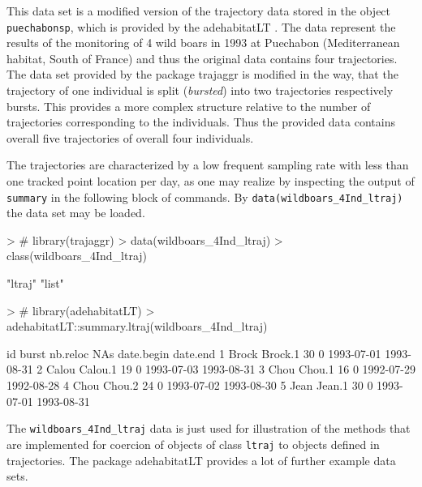 \documentclass[12pt, oneside, a4paper]{scrbook}
\newcommand{\pkg}[1]{{\normalfont\fontseries{b}\selectfont #1}}
\let\code=\texttt
\begin{document}
This data set is a modified version of the trajectory data stored in the object \code{puechabonsp}, which is provided by the \pkg{adehabitatLT} \citep{calenge_adehabitatlt:_2014}. The data represent the results of the monitoring of 4 wild boars in 1993 at Puechabon (Mediterranean habitat, South of France) and thus the original data contains four trajectories. The data set provided by the package \pkg{trajaggr} is modified in the way, that the trajectory of one individual is split (\textit{bursted}) into two trajectories respectively bursts. 
This provides a more complex structure relative to the number of trajectories corresponding to the individuals. Thus the provided data contains overall five trajectories of overall four individuals.
\par\medskip

The trajectories are characterized by a low frequent sampling rate with less than one tracked point location per day, as one may realize by inspecting the output of \code{summary} in the following block of commands. By \code{data(wildboars\_4Ind\_ltraj)} the data set may be loaded.
\par\medskip

\begin{small}
\begin{Schunk}
\begin{Sinput}
> # library(trajaggr)
> data(wildboars_4Ind_ltraj)
> class(wildboars_4Ind_ltraj)
\end{Sinput}
\begin{Soutput}
[1] "ltraj" "list" 
\end{Soutput}
\begin{Sinput}
> # library(adehabitatLT)
> adehabitatLT::summary.ltraj(wildboars_4Ind_ltraj)
\end{Sinput}
\begin{Soutput}
     id   burst nb.reloc NAs date.begin   date.end
1 Brock Brock.1       30   0 1993-07-01 1993-08-31
2 Calou Calou.1       19   0 1993-07-03 1993-08-31
3  Chou  Chou.1       16   0 1992-07-29 1992-08-28
4  Chou  Chou.2       24   0 1993-07-02 1993-08-30
5  Jean  Jean.1       30   0 1993-07-01 1993-08-31
\end{Soutput}
\end{Schunk}
\end{small}

\par\medskip

The \code{wildboars\_4Ind\_ltraj} data is just used for illustration of the methods that are implemented for coercion of objects of class \code{ltraj} to objects defined in \pkg{trajectories}.
The package \pkg{adehabitatLT} provides a lot of further example data sets.
\par\medskip
\end{document}

